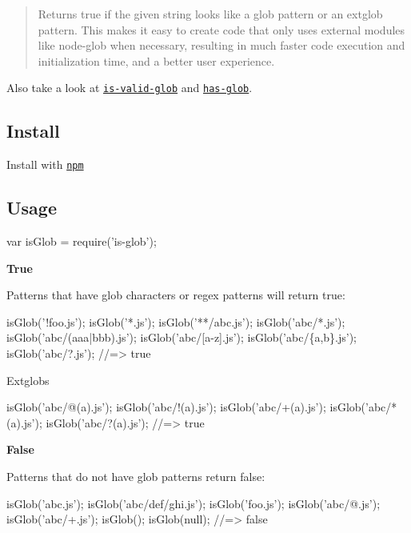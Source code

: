 \begin{quote}
Returns {\ttfamily true} if the given string looks like a glob pattern or an extglob pattern. This makes it easy to create code that only uses external modules like node-\/glob when necessary, resulting in much faster code execution and initialization time, and a better user experience. \end{quote}


Also take a look at \href{https://github.com/jonschlinkert/is-valid-glob}{\tt is-\/valid-\/glob} and \href{https://github.com/jonschlinkert/has-glob}{\tt has-\/glob}.

\subsection*{Install}

Install with \href{https://www.npmjs.com/}{\tt npm}




\subsection*{Usage}


\begin{DoxyCode}
var isGlob = require('is-glob');
\end{DoxyCode}


{\bfseries True}

Patterns that have glob characters or regex patterns will return {\ttfamily true}\+:


\begin{DoxyCode}
isGlob('!foo.js');
isGlob('*.js');
isGlob('**/abc.js');
isGlob('abc/*.js');
isGlob('abc/(aaa|bbb).js');
isGlob('abc/[a-z].js');
isGlob('abc/\{a,b\}.js');
isGlob('abc/?.js');
//=> true
\end{DoxyCode}


Extglobs


\begin{DoxyCode}
isGlob('abc/@(a).js');
isGlob('abc/!(a).js');
isGlob('abc/+(a).js');
isGlob('abc/*(a).js');
isGlob('abc/?(a).js');
//=> true
\end{DoxyCode}


{\bfseries False}

Patterns that do not have glob patterns return {\ttfamily false}\+:


\begin{DoxyCode}
isGlob('abc.js');
isGlob('abc/def/ghi.js');
isGlob('foo.js');
isGlob('abc/@.js');
isGlob('abc/+.js');
isGlob();
isGlob(null);
//=> false
\end{DoxyCode}


